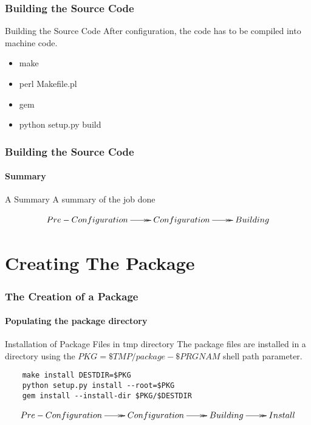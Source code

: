 \documentclass[12pt,hyperref={pdfpagelabels=true}]{beamer}
\begin{document}
\begin{frame}
  \frametitle{Building the Source Code}
  \begin{block}{Building the Source Code}
    After configuration, the code has to be compiled into machine code.
  \end{block}

  \pause

  \begin{example}
    \begin{itemize}[<+-| alert@+>]
    \item make
    \item perl Makefile.pl
    \item gem
    \item python setup.py build
    \end{itemize}
  \end{example}
\end{frame}

\begin{frame}
  \frametitle{Building the Source Code}
  \framesubtitle{Summary}
  \begin{block}{A Summary}
      A summary of the job done
  \end{block}
  \begin{equation*}
    \xymatrix@C=2pc@R=2pc{
    Pre-Configuration\ar@{->>}[r] & Configuration\ar@{->>}[r] & Building}
  \end{equation*}
\end{frame}

\section{Creating The Package}

\begin{frame}[fragile]
  \frametitle{The Creation of a Package}
  \framesubtitle{Populating the package directory}
  \begin{block}{Installation of Package Files in tmp directory}
    The package files are installed in a directory using the
    $PKG=\$TMP/package-\$PRGNAM$ shell path parameter.
  \end{block}
  
  \pause
  
  \begin{lstlisting}
    make install DESTDIR=$PKG
    python setup.py install --root=$PKG
    gem install --install-dir $PKG/$DESTDIR
  \end{lstlisting}

  \pause

  \begin{equation*}
    \xymatrix@C=2pc@R=2pc{
    Pre-Configuration\ar@{->>}[r] & Configuration\ar@{->>}[r] &
    Building\ar@{->>}[r] & Install}
  \end{equation*}
\end{frame}
\end{document}
